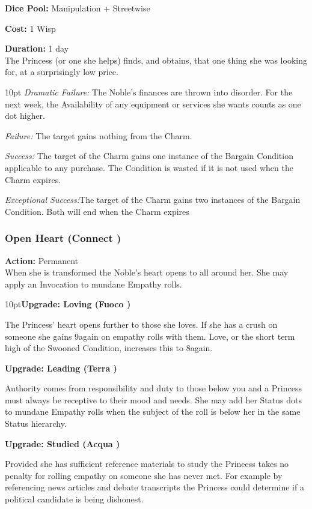 \noindent \textbf{Dice Pool:} Manipulation + Streetwise

\noindent \textbf{Cost:} 1 Wisp

\noindent \textbf{Duration:} 1 day \\

\noindent The Princess (or one she helps) finds, and obtains, that one thing she was looking for, at a surprisingly low price.

\begin{myindentpar}{10pt}    \emph{Dramatic Failure:} The Noble’s finances are thrown into disorder. For the next week, the Availability of any equipment or services she wants counts as one dot higher.

\emph{Failure:} The target gains nothing from the Charm.

\emph{Success:} The target of the Charm gains one instance of the Bargain Condition applicable to any purchase. The Condition is wasted if it is not used when the Charm expires. 

\emph{Exceptional Success:}The target of the Charm gains two instances of the Bargain Condition. Both will end when the Charm expires \end{myindentpar}

\subsubsection*{Open Heart (Connect \textbullet)}

\noindent \textbf{Action:} Permanent \\

\noindent When she is transformed the Noble's heart opens to all around her. She may apply an Invocation to mundane Empathy rolls. 

\begin{myindentpar}{10pt}\textbf{Upgrade: Loving (Fuoco \textbullet)}

	The Princess' heart opens further to those she loves. If she has a crush on someone she gains 9again on empathy rolls with them. Love, or the short term high of the Swooned Condition, increases this to 8again.
	
	\textbf{Upgrade: Leading (Terra \textbullet\textbullet)}

	Authority comes from responsibility and duty to those below you and a Princess must always be receptive to their mood and needs. She may add her Status dots to mundane Empathy rolls when the subject of the roll is below her in the same Status hierarchy. 
	
	\textbf{Upgrade: Studied (Acqua \textbullet)}

	Provided she has sufficient reference materials to study the Princess takes no penalty for rolling empathy on someone she has never met. For example by referencing news articles and debate transcripts the Princess could determine if a political candidate is being dishonest.  

	\end{myindentpar}

